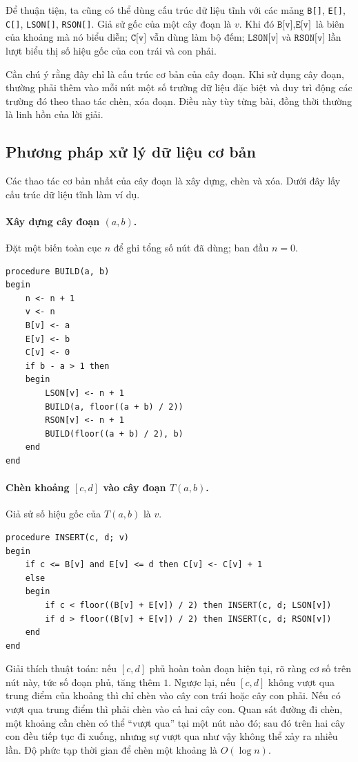 \documentclass[11pt]{article}
\begin{document}
Để thuận tiện, ta cũng có thể dùng cấu trúc dữ liệu tĩnh với các mảng
\texttt{B[]}, \texttt{E[]}, \texttt{C[]}, \texttt{LSON[]}, \texttt{RSON[]}.
Giả sử gốc của một cây đoạn là \(v\). Khi đó \(\texttt{B[v]},\texttt{E[v]}\)
là biên của khoảng mà nó biểu diễn; \(\texttt{C[v]}\) vẫn dùng làm bộ đếm;
\(\texttt{LSON[v]}\) và \(\texttt{RSON[v]}\) lần lượt biểu thị số hiệu gốc
của con trái và con phải.

Cần chú ý rằng đây chỉ là cấu trúc cơ bản của cây đoạn. Khi sử dụng cây đoạn,
thường phải thêm vào mỗi nút một số trường dữ liệu đặc biệt và duy trì động
các trường đó theo thao tác chèn, xóa đoạn. Điều này tùy từng bài, đồng thời
thường là linh hồn của lời giải.

\subsection{Phương pháp xử lý dữ liệu cơ bản}

Các thao tác cơ bản nhất của cây đoạn là xây dựng, chèn và xóa. Dưới đây lấy
cấu trúc dữ liệu tĩnh làm ví dụ.

\paragraph{Xây dựng cây đoạn \((a,b)\).}
Đặt một biến toàn cục \(n\) để ghi tổng số nút đã dùng; ban đầu \(n=0\).

\begin{verbatim}
procedure BUILD(a, b)
begin
    n <- n + 1
    v <- n
    B[v] <- a
    E[v] <- b
    C[v] <- 0
    if b - a > 1 then
    begin
        LSON[v] <- n + 1
        BUILD(a, floor((a + b) / 2))
        RSON[v] <- n + 1
        BUILD(floor((a + b) / 2), b)
    end
end
\end{verbatim}

\paragraph{Chèn khoảng \([c,d]\) vào cây đoạn \(T(a,b)\).}
Giả sử số hiệu gốc của \(T(a,b)\) là \(v\).

\begin{verbatim}
procedure INSERT(c, d; v)
begin
    if c <= B[v] and E[v] <= d then C[v] <- C[v] + 1
    else
    begin
        if c < floor((B[v] + E[v]) / 2) then INSERT(c, d; LSON[v])
        if d > floor((B[v] + E[v]) / 2) then INSERT(c, d; RSON[v])
    end
end
\end{verbatim}

Giải thích thuật toán: nếu \([c,d]\) phủ hoàn toàn đoạn hiện tại, rõ ràng cơ
số trên nút này, tức số đoạn phủ, tăng thêm \(1\). Ngược lại, nếu \([c,d]\)
không vượt qua trung điểm của khoảng thì chỉ chèn vào cây con trái hoặc cây
con phải. Nếu có vượt qua trung điểm thì phải chèn vào cả hai cây con. Quan
sát đường đi chèn, một khoảng cần chèn có thể ``vượt qua'' tại một nút nào đó;
sau đó trên hai cây con đều tiếp tục đi xuống, nhưng sự vượt qua như vậy
không thể xảy ra nhiều lần. Độ phức tạp thời gian để chèn một khoảng là
\(O(\log n)\).
\end{document}
